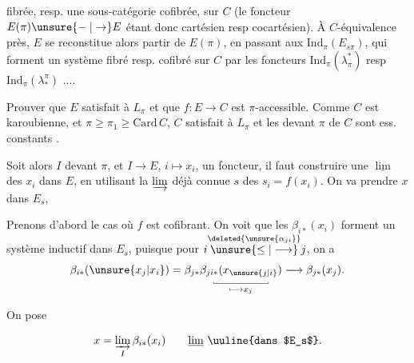 fibrée, resp. une sous-catégorie cofibrée, sur $C$ (le foncteur $E(\pi)\unsure{\relbar|\to}E$ étant donc cartésien resp cocartésien). À $C$-équivalence près, $E$ se reconstitue alors  partir de $E(\pi)$, en passant aux $\mathrm{Ind}_\pi(E_{s\pi})$,  qui forment un système fibré resp. cofibré sur $C$ par les foncteurs $\mathrm{Ind}_\pi(\lambda^\ast_\pi)$ resp $\mathrm{Ind}_\pi(\lambda_*^\pi)$ ....


Prouver que $E$ satisfait à $L_\pi$ et que $f:E\to C$ est $\pi$-accessible. Comme $C$ est karoubienne, et $\pi\geq\pi_1\geq\mathrm{Card}\,C$, $C$ satisfait à $L_\pi$ et les    devant $\pi$ de $C$ sont ess. constants .

Soit alors $I$  devant $\pi$, et $I\longrightarrow E$, $i\mapsto x_i$, un foncteur, il faut construire une $\underline{\lim}$ des $x_i$ dans $E$, en utilisant la $\varinjlim$ déjà connue $s$ des $s_i=f(x_i)$.  On va prendre  $x$ dans $E_s$,

Prenons d'abord le cas où $f$ est cofibrant. On voit que les  $\beta_{i*}(x_i)$ forment un système inductif dans $E_s$, puisque pour
$i\overset{\deleted{\unsure{\alpha_{ji}}}}{\unsure{\leq|\longrightarrow}}j$, on a
\[ \beta_{i*}(\unsure{x_j|x_i})=\beta_{j*}\underset{\longmapsto x_j}{\underset{\rule{.35pt}{.4ex}\rule{4.9em}{.35pt}\rule{.35pt}{.4ex}}{\beta_{ji*}(x_{\unsure{j|i}})}}\longrightarrow\beta_{j*}(x_j). \]

On  pose

\[ x=\varinjlim_I\beta_{i*}(x_i)\qquad \underline{\lim}\ \text{\uuline{dans $E_s$}}. \]

